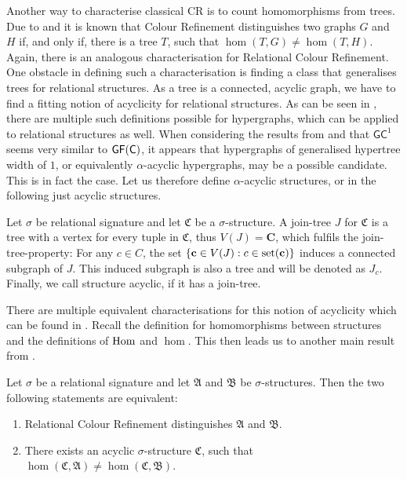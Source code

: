 Another way to characterise classical CR is to count homomorphisms from trees.
Due to \cite{dvorak2010RecognizingGraphsa} and \cite{dell2018LovaszMeets} it is known that Colour Refinement distinguishes two graphs $G$ and $H$ if, and only if, there is a tree $T$, such that $\hom(T,G)\neq\hom(T,H)$.
Again, there is an analogous characterisation for Relational Colour Refinement.
One obstacle in defining such a characterisation is finding a class that generalises trees for relational structures.
As a tree is a connected, acyclic graph, we have to find a fitting notion of acyclicity for relational structures.
As can be seen in \cite{brault-baron2014HypergraphAcyclicity}, there are multiple such definitions possible for hypergraphs, which can be applied to relational structures as well.
When considering the results from \cite{scheidt2023CountingHomomorphisms} and that $\mathsf{GC}^1$ seems very similar to $\mathsf{GF}(\mathsf{C})$, it appears that hypergraphs of generalised hypertree width of $1$, or equivalently $\alpha$-acyclic hypergraphs, may be a possible candidate.
This is in fact the case.
Let us therefore define $\alpha$-acyclic structures, or in the following just acyclic structures.

\begin{definition}
	\label{def:alphaAcyclic}
	Let $\sigma$ be relational signature and let $\mathfrak C$ be a $\sigma$-structure.
	A join-tree $J$ for $\mathfrak C$ is a tree with a vertex for every tuple in $\mathfrak C$, thus $V(J)=\mathbf C$, which fulfils the join-tree-property:
	For any $c\in C$, the set $\{\mathbf c \in V(J) : c\in \operatorname{set}(\mathbf c)\}$ induces a connected subgraph of $J$.
	This induced subgraph is also a tree and will be denoted as $J_c$.
	Finally, we call structure acyclic, if it has a join-tree.
\end{definition}
There are multiple equivalent characterisations for this notion of acyclicity which can be found in \cite{brault-baron2014HypergraphAcyclicity}.
Recall the definition for homomorphisms between structures and the definitions of $\operatorname{Hom}$ and $\hom$.
This then leads us to another main result from \cite{scheidt2025ColorRefinement}.

\begin{theorem}
	Let $\sigma$ be a relational signature and let $\mathfrak A$ and $\mathfrak B$ be $\sigma$-structures.
	Then the two following statements are equivalent:
	\begin{enumerate}
		\item Relational Colour Refinement distinguishes $\mathfrak A$ and $\mathfrak B$.
		\item There exists an acyclic $\sigma$-structure $\mathfrak C$, such that $\hom(\mathfrak C,\mathfrak A)\neq\hom(\mathfrak C,\mathfrak B)$.
	\end{enumerate}
\end{theorem}

